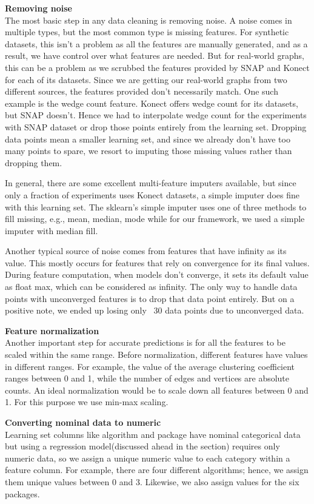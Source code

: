 \textbf{Removing noise}\\
The most basic step in any data cleaning is removing noise. A noise comes in multiple types, but the most common type is missing features. For synthetic datasets, this isn't a problem as all the features are manually generated, and as a result, we have control over what features are needed. But for real-world graphs, this can be a problem as we scrubbed the features provided by SNAP and Konect for each of its datasets. Since we are getting our real-world graphs from two different sources, the features provided don't necessarily match. One such example is the wedge count feature. Konect offers wedge count for its datasets, but SNAP doesn't. Hence we had to interpolate wedge count for the experiments with SNAP dataset or drop those points entirely from the learning set. Dropping data points mean a smaller learning set, and since we already don't have too many points to spare, we resort to imputing those missing values rather than dropping them. 

In general, there are some excellent multi-feature imputers available, but since only a fraction of experiments uses Konect datasets, a simple imputer does fine with this learning set. The sklearn's simple imputer uses one of three methods to fill missing, e.g., mean, median, mode while for our framework, we used a simple imputer with median fill. 

Another typical source of noise comes from features that have infinity as its value. This mostly occurs for features that rely on convergence for its final values. During feature computation, when models don't converge, it sets its default value as float max, which can be considered as infinity. The only way to handle data points with unconverged features is to drop that data point entirely. But on a positive note, we ended up losing only ~30 data points due to unconverged data.

\textbf{Feature normalization}\\
Another important step for accurate predictions is for all the features to be scaled within the same range. Before normalization, different features have values in different ranges. For example, the value of the average clustering coefficient ranges between 0 and 1, while the number of edges and vertices are absolute counts. An ideal normalization would be to scale down all features between 0 and 1. For this purpose we use min-max scaling.

\textbf{Converting nominal data to numeric}\\
Learning set columns like algorithm and package have nominal categorical data but using a regression model(discussed ahead in the section) requires only numeric data, so we assign a unique numeric value to each category within a feature column. For example, there are four different algorithms; hence, we assign them unique values between 0 and 3. Likewise, we also assign values for the six packages.

